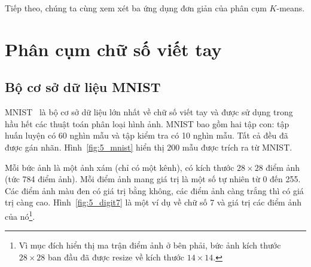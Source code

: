 Tiếp theo, chúng ta cùng xem xét ba ứng dụng đơn giản của phân cụm $K$-means.






\section{Phân cụm chữ số viết tay }

\subsection{Bộ cơ sở dữ liệu MNIST }

MNIST~\cite{lecun2010mnist} là bộ cơ sở dữ liệu lớn nhất về chữ số viết tay và
được sử dụng trong hầu hết các thuật toán phân loại hình ảnh. MNIST bao gồm hai
tập con: tập huấn luyện có 60 nghìn mẫu và tập kiểm tra có 10 nghìn mẫu. Tất cả
đều đã được gán nhãn. Hình~\ref{fig:5_mnist} hiển thị 200 mẫu được trích ra từ
MNIST.




Mỗi bức ảnh là một ảnh xám (chỉ có một kênh), có kích thước $28\times28$
điểm ảnh (tức 784 điểm ảnh). Mỗi điểm ảnh mang giá trị là một số tự nhiên từ 0
đến 255. Các điểm ảnh màu đen có giá trị bằng không, các điểm ảnh càng trắng thì có giá trị càng cao. Hình~\ref{fig:5_digit7} là một ví dụ về chữ
số 7 và giá trị các điểm ảnh của nó\footnote{Vì mục đích hiển thị ma trận điểm ảnh ở
bên phải, bức ảnh kích thước $28 \times 28$ ban đầu đã được resize về kích thước
$14 \times 14$.}.

